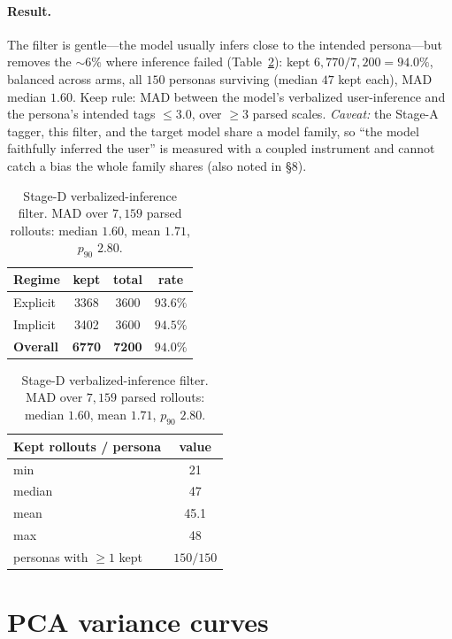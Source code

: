 \documentclass{article}
\begin{document}
\paragraph{Result.} The filter is gentle---the model usually infers close to the
intended persona---but removes the ${\sim}6\%$ where inference failed
(Table~\ref{tab:staged}): kept $6{,}770/7{,}200 = 94.0\%$, balanced across arms,
all $150$ personas surviving (median $47$ kept each), MAD median $1.60$. Keep rule:
MAD between the model's verbalized user-inference and the persona's intended tags
$\le 3.0$, over $\ge 3$ parsed scales. \emph{Caveat:} the Stage-A tagger, this
filter, and the target model share a model family, so ``the model faithfully
inferred the user'' is measured with a coupled instrument and cannot catch a bias
the whole family shares (also noted in \S8).

\begin{table}[h]
\centering\small
\caption{Stage-D verbalized-inference filter. MAD over $7{,}159$ parsed rollouts:
median $1.60$, mean $1.71$, $p_{90}$ $2.80$.}
\label{tab:staged}
\begin{tabular}{lccc}
\toprule
Regime & kept & total & rate \\
\midrule
Explicit & 3368 & 3600 & $93.6\%$ \\
Implicit & 3402 & 3600 & $94.5\%$ \\
\textbf{Overall} & \textbf{6770} & \textbf{7200} & $\mathbf{94.0\%}$ \\
\bottomrule
\end{tabular}
\quad
\begin{tabular}{lc}
\toprule
Kept rollouts / persona & value \\
\midrule
min & 21 \\
median & 47 \\
mean & 45.1 \\
max & 48 \\
personas with $\ge 1$ kept & $150/150$ \\
\bottomrule
\end{tabular}
\end{table}

\section{PCA variance curves}\label{app:variance}
\end{document}
